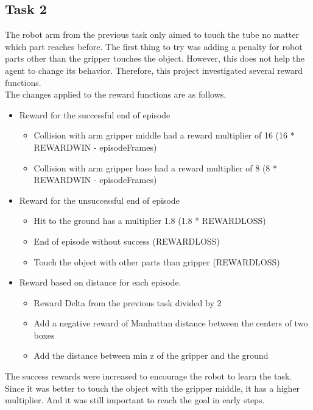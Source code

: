 \documentclass[10pt,journal,compsoc]{IEEEtran}
\begin{document}
\subsection{Task 2}
The robot arm from the previous task only aimed to touch the tube no matter which part reaches before. The first thing to try was adding a penalty for robot parts other than the gripper touches the object. However, this does not help the agent to change its behavior. Therefore, this project investigated several reward functions.\\
The changes applied to the reward functions are as follows.
\begin{itemize}
\item Reward for the successful end of episode
   \begin{itemize}
     \item Collision with arm gripper middle had a reward multiplier of 16 (16 * REWARD\textunderscore WIN - episodeFrames)
     \item Collision with arm gripper base had a reward multiplier of 8 (8 * REWARD\textunderscore WIN - episodeFrames)
   \end{itemize}
\item Reward for the unsuccessful end of episode
   \begin{itemize}
     \item Hit to the ground has a multiplier 1.8 (1.8 * REWARD\textunderscore LOSS)
     \item End of episode without success (REWARD\textunderscore LOSS)
     \item Touch the object with other parts than gripper (REWARD\textunderscore LOSS)
   \end{itemize}
\item Reward based on distance for each episode.
   \begin{itemize}
     \item Reward Delta from the previous task divided by 2
     \item Add a negative reward of Manhattan distance between the centers of two boxes
     \item Add the distance between min z of the gripper and the ground
   \end{itemize}
\end{itemize}
The success rewards were increased to encourage the robot to learn the task. Since it was better to touch the object with the gripper middle, it has a higher multiplier. And it was still important to reach the goal in early steps.\\
\end{document}
